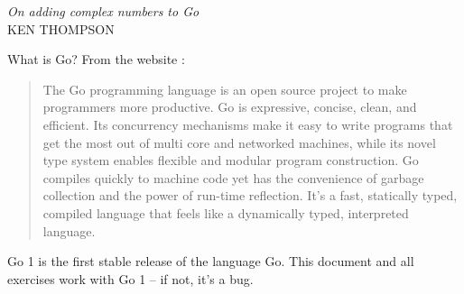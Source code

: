 {\textit{On adding complex numbers to Go}\\ \textsc{KEN THOMPSON}}

\noindent{}What is Go? From the website \cite{go_web}:
\begin{quote}
The Go programming language is an open source project to make
programmers more productive. Go is expressive, concise, clean, and
efficient. Its concurrency mechanisms make it easy to write programs
that get the most out of multi core and networked machines, while its
novel type system enables flexible and modular program construction. Go
compiles quickly to machine code yet has the convenience of garbage
collection and the power of run-time reflection. It's a fast, statically
typed, compiled language that feels like a dynamically typed,
interpreted language.
\end{quote}

Go 1 is the first stable release of the language Go. 
This document and all exercises work with Go 1 -- if not, it's a bug.

